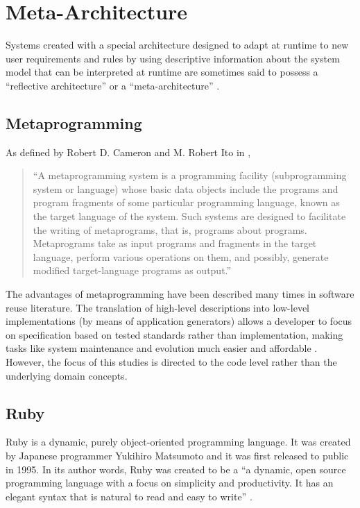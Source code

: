 
\section{Meta-Architecture}\label{sec:meta-architecture}

Systems created with a special architecture designed to adapt at runtime to new user requirements and rules by using descriptive information about the system model that can be interpreted at runtime are sometimes said to possess a ``reflective architecture'' or a ``meta-architecture'' \cite{YBJ01}.

\subsection{Metaprogramming}\label{sec:metaprogramming}

As defined by Robert D. Cameron and M. Robert Ito in \cite{CI84},

\begin{quote}
 ``A metaprogramming system is a programming facility (subprogramming system or language) whose basic data objects include the programs and program fragments of some particular programming language, known as the target language of the system. Such systems are designed to facilitate the writing of metaprograms, that is, programs about programs. Metaprograms take as input programs and fragments in the target language, perform various operations on them, and possibly, generate modified target-language programs as output.''
\end{quote}

The advantages of metaprogramming have been described many times in software reuse literature. The translation of high-level descriptions into low-level implementations (by means of application generators) allows a developer to focus on specification based on tested standards rather than implementation, making tasks like system maintenance and evolution much easier and affordable \cite{Bas87,Cle88}. However, the focus of this studies is directed to the code level rather than the underlying domain concepts.

\subsection{Ruby}\label{sec:ruby}

Ruby is a dynamic, purely object-oriented programming language. It was created by Japanese programmer Yukihiro Matsumoto and it was first released to public in 1995. In its author words, Ruby was created to be a ``a dynamic, open source programming language with a focus on simplicity and productivity. It has an elegant syntax that is natural to read and easy to write'' \cite{ruby}.

